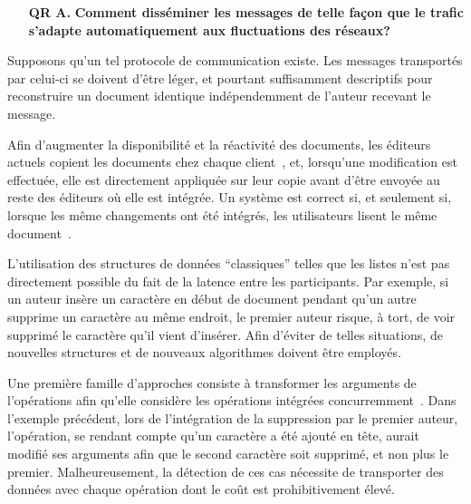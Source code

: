 \begin{itemize}
  \begin{itemize}
  \item [\textbf{QR A.}] \textbf{Comment disséminer les messages de telle façon
      que le trafic s'adapte automatiquement aux fluctuations des réseaux?}
  \end{itemize}

  Supposons qu'un tel protocole de communication existe. Les messages
  transportés par celui-ci se doivent d'être léger, et pourtant suffisamment
  descriptifs pour reconstruire un document identique indépendemment de l'auteur
  recevant le message.

  Afin d'augmenter la disponibilité et la réactivité des documents, les éditeurs
  actuels copient les documents chez chaque client~\cite{saito2005optimistic},
  et, lorsqu'une modification est effectuée, elle est directement appliquée sur
  leur copie avant d'être envoyée au reste des éditeurs où elle est intégrée. Un
  système est correct si, et seulement si, lorsque les même changements ont été
  intégrés, les utilisateurs lisent le même document~\cite{shapiro2011conflict}.

  L'utilisation des structures de données ``classiques'' telles que les listes
  n'est pas directement possible du fait de la latence entre les
  participants. Par exemple, si un auteur insère un caractère en début de
  document pendant qu'un autre supprime un caractère au même endroit, le premier
  auteur risque, à tort, de voir supprimé le caractère qu'il vient
  d'insérer. Afin d'éviter de telles situations, de nouvelles structures et de
  nouveaux algorithmes doivent être employés.

  Une première famille d'approches consiste à transformer les arguments de
  l'opérations afin qu'elle considère les opérations intégrées
  concurremment~\cite{sun1998operational}. Dans l'exemple précédent, lors de
  l'intégration de la suppression par le premier auteur, l'opération, se rendant
  compte qu'un caractère a été ajouté en tête, aurait modifié ses arguments afin
  que le second caractère soit supprimé, et non plus le
  premier. Malheureusement, la détection de ces cas nécessite de transporter des
  données avec chaque opération dont le coût est prohibitivement
  élevé.


\end{itemize}

